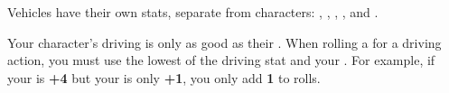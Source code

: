 
Vehicles have their own stats, separate from characters: , , , ,  and .

Your character's driving is only as good as their . When rolling a for a driving action, you must use the lowest of the driving stat and your . For example, if your  is \textbf{+4} but your  is only \textbf{+1}, you only add \textbf{1} to  rolls.
